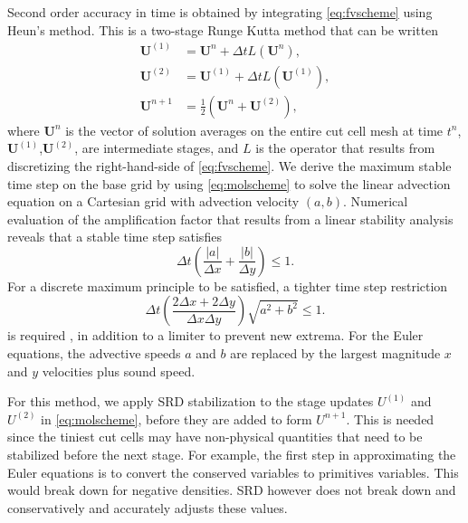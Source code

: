 Second order accuracy in time is obtained by integrating \eqref{eq:fvscheme} using Heun's method.  This is a two-stage Runge Kutta method that can be written
\begin{equation}\label{eq:molscheme}
\begin{aligned}
	\mathbf{U}^{(1)} &= \mathbf{U}^{n} + \Delta t L(\mathbf{U}^n), \\
	\mathbf{U}^{(2)} &= \mathbf{U}^{(1)} + \Delta t L(\mathbf{U}^{(1)}), \\
	\mathbf{U}^{n+1} &= \frac{1}{2}( \mathbf{U}^{n} + \mathbf{U}^{(2)} ) ,	
\end{aligned}
\end{equation}
where $\mathbf{U}^{n}$ is the vector of solution averages on the entire cut cell mesh at time $t^n$,
$\mathbf{U}^{(1)}$,$\mathbf{U}^{(2)}$, are intermediate stages, and $L$ is the operator that results
from discretizing the right-hand-side of \eqref{eq:fvscheme}.
We derive the maximum stable time step on the base grid by using \eqref{eq:molscheme} to solve the linear advection equation on a Cartesian grid with advection velocity $(a,b)$.
Numerical evaluation of the amplification factor that results from a linear stability analysis reveals that a stable time step satisfies
\begin{equation}\label{eq:vn1}
\Delta t   \left( \frac{|a|}{\Delta x} + \frac{|b|}{\Delta y} \right)\leq 1.
\end{equation}
For a discrete maximum principle to be satisfied, a tighter 
time step restriction 
\begin{equation}
\Delta t  \left( \frac{2\Delta x + 2 \Delta y}{\Delta x \Delta y} \right) \sqrt{a^2 + b^2}\leq 1 .
\end{equation}
is required \cite{giuliani2018analysis}, in addition to a limiter to prevent new extrema.
For the Euler equations, the advective speeds $a$ and $b$ are replaced
by the largest magnitude $x$ and $y$ velocities  plus sound speed.

For this method, we apply SRD stabilization to the stage updates
$U^{(1)}$ and $U^{(2)}$ in \eqref{eq:molscheme}, before they are added to 
form $U^{n+1}$.  This is needed since the tiniest cut cells may have
non-physical quantities that need to be stabilized before  the
next stage.  For example, the first step in approximating the Euler
equations is to convert the conserved variables to primitives variables.
This would break down for negative densities. SRD however does not break
down and conservatively and accurately adjusts these values.

